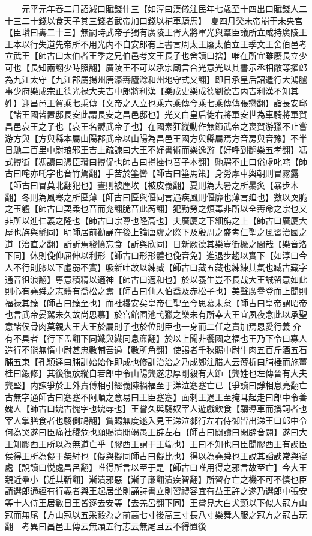 　　元平元年春二月詔減口賦錢什三【如淳曰漢儀注民年七歲至十四出口賦錢人二十三二十錢以食天子其三錢者武帝加口錢以補車騎馬】　夏四月癸未帝崩于未央宫【臣瓚曰夀二十三】無嗣時武帝子獨有廣陵王胥大將軍光與羣臣議所立咸持廣陵王王本以行失道先帝所不用光内不自安郎有上書言周太王廢太伯立王季文王舍伯邑考立武王【師古曰太伯者王季之兄伯邑考文王長子也舍讀曰捨】唯在所宜雖廢長立少可也【長知兩翻少時照翻】廣陵王不可以承宗廟言合光意光以其書示丞相敞等擢郎為九江太守【九江郡屬揚州唐濠夀廬滁和州地守式又翻】即日承皇后詔遣行大鴻臚事少府樂成宗正德光禄大夫吉中郎將利漢【樂成史樂成德劉德吉丙吉利漢不知其姓】迎昌邑王賀乘七乘傳【文帝之入立也乘六乘傳今乘七乘傳傳張戀翻】詣長安邸【諸王國皆置邸長安此謂長安之昌邑邸也】光又白皇后徙右將軍安世為車騎將軍賀昌邑哀王之子也【哀王名髆武帝子也】在國素狂縱動作無節武帝之喪賀游獵不止嘗游方與【方與縣本屬山陽郡武帝以山陽為昌邑王國方與縣屬焉方音房與音豫】不半日馳二百里中尉琅邪王吉上疏諫曰大王不好書術而樂逸游【好呼到翻樂五孝翻】馮式撙衘【馮讀曰憑臣瓚曰撙促也師古曰撙挫也音子本翻】馳騁不止口倦虖叱咤【師古曰咤亦吒字也音竹駕翻】手苦於箠轡【師古曰箠馬策】身勞虖車輿朝則冒霧露【師古曰冒莫北翻犯也】晝則被塵埃【被皮義翻】夏則為大暑之所㬥炙【暴步木翻】冬則為風寒之所匽薄【師古曰匽與偃同言遇疾風則偃靡也薄言廹也】數以耎脆之玉軆【師古曰耎柔也音而兖翻脆音此芮翻】犯勤勞之煩毒非所以全夀命之宗也又非所以進仁義之隆也【師古曰宗尊也隆高也】夫廣厦之下細旃之上【師古曰廣厦大屋也旃與氈同】明師居前勸誦在後上論唐虞之際下及殷周之盛考仁聖之風習治國之道【治直之翻】訢訢焉發憤忘食【訢與欣同】日新厥德其樂豈衘橛之間哉【樂音洛下同】休則俛仰屈伸以利形【師古曰形形體也俛音免】進退步趨以實下【如淳曰今人不行則膝以下虛弱不實】吸新吐故以練臧【師古曰藏五藏也練練其氣也臧古藏字通音徂浪翻】專意積精以適神【師古曰適和也】於以養生豈不長哉大王誠留意如此則心有堯舜之志體有喬松之夀【師古曰仙人伯喬及赤松子也】美聲廣譽登而上聞則福禄其臻【師古曰臻至也】而社稷安矣皇帝仁聖至今思慕未怠【師古曰皇帝謂昭帝也言武帝晏駕未久故尚思慕】於宫館囿池弋獵之樂未有所幸大王宜夙夜念此以承聖意諸侯骨肉莫親大王大王於屬則子也於位則臣也一身而二任之責加焉恩愛行義介有不具者【行下孟翻下同孅與纎同息亷翻】於以上聞非饗國之福也王乃下令曰寡人造行不能無惰中尉甚忠數輔吾過【數所角翻】使謁者千秋賜中尉牛肉五百斤酒五石脯五束【孔穎達曰脯訓始始作即成也修訓治治之乃成鄭注腊人云薄析曰脯棰而施薑桂曰鍜修】其後復放縱自若郎中令山陽龔遂忠厚剛毅有大節【龔姓也左傳晉有大夫龔堅】内諫爭於王外責傅相引經義陳禍福至于涕泣蹇蹇亡已【爭讀曰諍相息亮翻亡古無字通師古曰蹇蹇不阿順之意易曰王臣蹇蹇】面刺王過王至掩耳起走曰郎中令善媿人【師古曰媿古愧字也媿辱也】王嘗久與騶奴宰人遊戲飲食【騶導車而撝訶者也宰人掌膳食者也騶側鳩翻】賞賜無度遂入見王涕泣䣛行左右侍御皆出涕王曰郎中令何為哭遂曰臣痛社稷危也願賜清閒竭愚王辟左右【師古曰閒讀曰閑辟音闢】遂曰大王知膠西王所以為無道亡乎【膠西王謂于王端也】王曰不知也曰臣聞膠西王有諛臣侯得王所為儗于桀紂也【儗與擬同師古曰儗比也】得以為堯舜也王說其謟諛常與寑處【說讀曰悦處昌呂翻】唯得所言以至于是【師古曰唯用得之邪言故至亡】今大王親近羣小【近其靳翻】漸漬邪惡【漸子亷翻漬疾智翻】所習存亡之機不可不慎也臣請選郎通經有行義者與王起居坐則誦詩書立則習禮容宜有益王許之遂乃選郎中張安等十人侍王居數日王皆逐去安等【去羌呂翻下同】王嘗見大白犬頸以下似人冠方山冠而無尾【方山冠以五采縠為之前高七寸後高三寸長八寸樂舞人服之冠方之冠古玩翻　考異曰昌邑王傳云無頭五行志云無尾且云不得置後